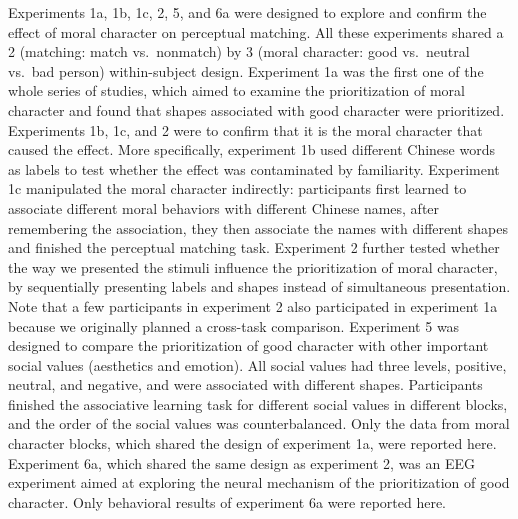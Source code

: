 \documentclass[
  man]{apa6}
\begin{document}
Experiments 1a, 1b, 1c, 2, 5, and 6a were designed to explore and confirm the effect of moral character on perceptual matching. All these experiments shared a 2 (matching: match vs.~nonmatch) by 3 (moral character: good vs.~neutral vs.~bad person) within-subject design. Experiment 1a was the first one of the whole series of studies, which aimed to examine the prioritization of moral character and found that shapes associated with good character were prioritized. Experiments 1b, 1c, and 2 were to confirm that it is the moral character that caused the effect. More specifically, experiment 1b used different Chinese words as labels to test whether the effect was contaminated by familiarity. Experiment 1c manipulated the moral character indirectly: participants first learned to associate different moral behaviors with different Chinese names, after remembering the association, they then associate the names with different shapes and finished the perceptual matching task. Experiment 2 further tested whether the way we presented the stimuli influence the prioritization of moral character, by sequentially presenting labels and shapes instead of simultaneous presentation. Note that a few participants in experiment 2 also participated in experiment 1a because we originally planned a cross-task comparison. Experiment 5 was designed to compare the prioritization of good character with other important social values (aesthetics and emotion). All social values had three levels, positive, neutral, and negative, and were associated with different shapes. Participants finished the associative learning task for different social values in different blocks, and the order of the social values was counterbalanced. Only the data from moral character blocks, which shared the design of experiment 1a, were reported here. Experiment 6a, which shared the same design as experiment 2, was an EEG experiment aimed at exploring the neural mechanism of the prioritization of good character. Only behavioral results of experiment 6a were reported here.
\end{document}
